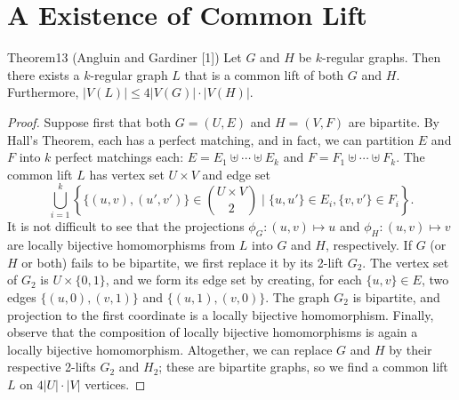 \section*{A Existence of Common Lift}
\begin{authorclaim}{Theorem13 (Angluin and Gardiner [1])}
Let $G$ and $H$ be $k$-regular graphs. Then there exists a $k$-regular graph $L$ that is a common lift of both $G$ and $H$. Furthermore, $|V(L)|\le4|V(G)|\cdot|V(H)|$.
\end{authorclaim}
\begin{proof}
Suppose first that both $G=(U,E)$ and $H=(V,F)$ are bipartite. By Hall's Theorem, each has a perfect matching, and in fact, we can partition $E$ and $F$ into $k$ perfect matchings each: $E=E_1\uplus\cdots\uplus E_k$ and $F=F_1\uplus\cdots\uplus F_k$. The common lift $L$ has vertex set $U\times V$ and edge set
\[
\bigcup_{i=1}^k\left\{\{(u,v),(u',v')\}\in\binom{U\times V}{2}\mid\{u,u'\}\in E_i,\{v,v'\}\in F_i\right\}.
\]
It is not difficult to see that the projections $\phi_G:(u,v)\mapsto u$ and $\phi_H:(u,v)\mapsto v$ are locally bijective homomorphisms from $L$ into $G$ and $H$, respectively.
If $G$ (or $H$ or both) fails to be bipartite, we first replace it by its 2-lift $G_2$. The vertex set of $G_2$ is $U\times\{0,1\}$, and we form its edge set by creating, for each $\{u,v\}\in E$, two edges $\{(u,0),(v,1)\}$ and $\{(u,1),(v,0)\}$. The graph $G_2$ is bipartite, and projection to the first coordinate is a locally bijective homomorphism. Finally, observe that the composition of locally bijective homomorphisms is again a locally bijective homomorphism. Altogether, we can replace $G$ and $H$ by their respective 2-lifts $G_2$ and $H_2$; these are bipartite graphs, so we find a common lift $L$ on $4|U|\cdot|V|$ vertices.
\end{proof}
